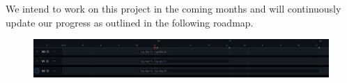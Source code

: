 \documentclass{article}
\begin{document}
\newpage
We intend to work on this project in the coming months and will continuously update our progress as outlined in the following roadmap.
\begin{figure}[h]
    
    \includegraphics[scale =   0.3 ]{../../images/roadmap.png}
    
    \end{figure}
    
\nocite{*}


\end{document}
